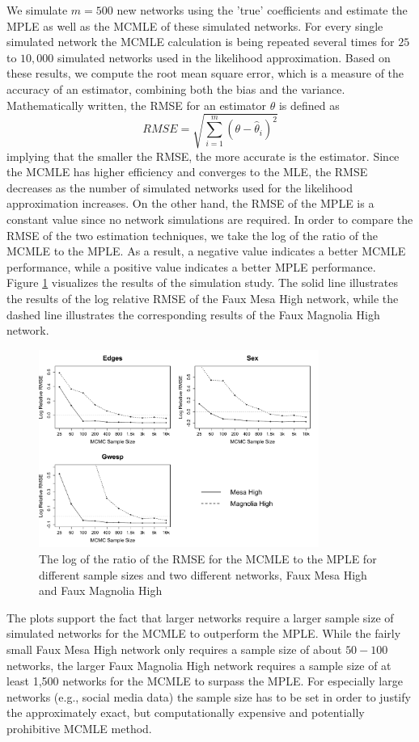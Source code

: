 \documentclass[10pt, conference, compsocconf]{IEEEtran}
\begin{document}
\indent We simulate $m=500$ new networks using the 'true' coefficients and estimate the MPLE as well as the MCMLE of these simulated networks. For every single simulated network the MCMLE calculation is being repeated several times for $25$ to $10,000$ simulated networks used in the likelihood approximation.
Based on these results, we compute the root mean square error, which is a measure of the accuracy of an estimator, combining both the bias and the variance. Mathematically written, the RMSE for an estimator $\hat{\theta}$ is defined as 
$$RMSE = \sqrt{\sum_{i=1}^{m}(\theta - \hat{\theta}_i)^2}$$
implying that the smaller the RMSE, the more accurate is the estimator. Since the MCMLE has higher efficiency and converges to the MLE, the RMSE decreases as the number of simulated networks used for the likelihood approximation increases. On the other hand, the RMSE of the MPLE is a constant value since no network simulations are required. In order to compare the RMSE of the two estimation techniques, we take the log of the ratio of the MCMLE to the MPLE. As a result, a negative value indicates a better MCMLE performance, while a positive value indicates a better MPLE performance.\\
\indent Figure \ref{rmse} visualizes the results of the simulation study. The solid line illustrates the results of the log relative RMSE of the Faux Mesa High network, while the dashed line illustrates the corresponding results of the Faux Magnolia High network. 
\begin{figure}[!t]
\centering
\includegraphics[width=3.6in]{RMSE_10k}
\caption{The log of the ratio of the RMSE for the MCMLE to the MPLE for different sample sizes and two different networks, Faux Mesa High and Faux Magnolia High}
\label{rmse}
\end{figure}
The plots support the fact that larger networks require a larger sample size of simulated networks for the MCMLE to outperform the MPLE. While the fairly small Faux Mesa High network only requires a sample size of about $50-100$ networks, the larger Faux Magnolia High network requires a sample size of at least 1,500 networks for the MCMLE to surpass the MPLE.  For especially large networks (e.g., social media data) the sample size has to be set in order to justify the approximately exact, but computationally expensive and potentially prohibitive MCMLE method.
\end{document}
